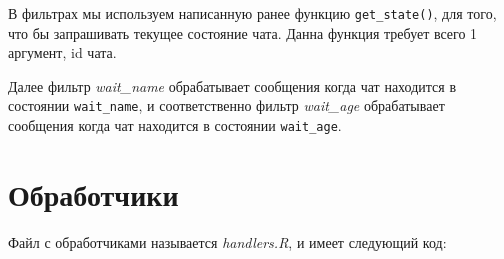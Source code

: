 \documentclass[
]{book}
\newenvironment{Shaded}{\begin{snugshade}}{\end{snugshade}}
\newcommand{\CommentTok}[1]{\textcolor[rgb]{0.56,0.35,0.01}{\textit{#1}}}
\newcommand{\DocumentationTok}[1]{\textcolor[rgb]{0.56,0.35,0.01}{\textbf{\textit{#1}}}}
\newcommand{\FunctionTok}[1]{\textcolor[rgb]{0.00,0.00,0.00}{#1}}
\newcommand{\NormalTok}[1]{#1}
\newcommand{\OtherTok}[1]{\textcolor[rgb]{0.56,0.35,0.01}{#1}}
\newcommand{\SpecialCharTok}[1]{\textcolor[rgb]{0.00,0.00,0.00}{#1}}
\newcommand{\StringTok}[1]{\textcolor[rgb]{0.31,0.60,0.02}{#1}}
\begin{document}
В фильтрах мы используем написанную ранее функцию \texttt{get\_state()}, для того, что бы запрашивать текущее состояние чата. Данна функция требует всего 1 аргумент, id чата.

Далее фильтр \emph{wait\_name} обрабатывает сообщения когда чат находится в состоянии \texttt{wait\_name}, и соответственно фильтр \emph{wait\_age} обрабатывает сообщения когда чат находится в состоянии \texttt{wait\_age}.

\hypertarget{ux43eux431ux440ux430ux431ux43eux442ux447ux438ux43aux438}{%
\section{Обработчики}\label{ux43eux431ux440ux430ux431ux43eux442ux447ux438ux43aux438}}

Файл с обработчиками называется \emph{handlers.R}, и имеет следующий код:

\begin{Shaded}
\end{Shaded}
\end{document}
